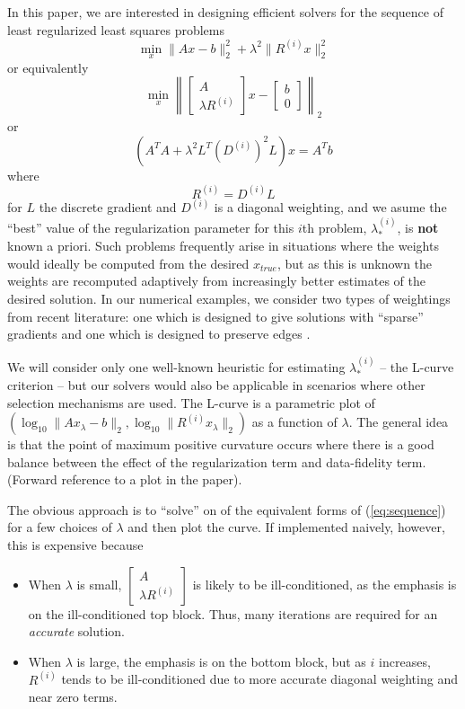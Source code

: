 In this paper, we are interested in designing efficient solvers for the sequence of least regularized least squares problems
\begin{equation} \label{eq:sequence} \min_{x} \| A x - b \|_2^2 + \lambda^2 \| R^{(i)} x \|_2^2 \end{equation}
or equivalently
\[ \min_x \left\| \left[ \begin{matrix} A \\ \lambda R^{(i)} \end{matrix} \right] x - \left[ \begin{matrix} b \\ 0 \end{matrix} \right] \right\|_2 \]
or 
\[ (A^TA + \lambda^2 L^T (D^{(i)})^2 L ) x = A^T b \]
where 
\[ R^{(i)} = D^{(i)} L \] 
for $L$ the discrete gradient and $D^{(i)}$ is a diagonal weighting, and we asume the ``best'' value of the regularization parameter for this $i$th problem, $\lambda^{(i)}_{*}$, is {\bf not} known a priori.   Such problems
frequently arise in situations where the weights would ideally be computed from the desired $x_{true}$, but as this is unknown the weights are recomputed adaptively from increasingly better estimates of the desired solution.    
In our numerical examples, we consider two types of weightings from recent literature:  one which is designed to give solutions with ``sparse'' gradients \cite{IRLS} and one which is designed to preserve edges \cite{KilmerEtalICIAM15}.  

We will consider only
one well-known heuristic for estimating $\lambda^{(i)}_*$ -- the L-curve criterion -- but our solvers would also be applicable in scenarios where other selection mechanisms are used.       
The L-curve \cite{OlearyHansen,etc} is a parametric plot of $( \log_10 \|A x_{\lambda} - b \|_2,\log_10 \| R^{(i)} x_{\lambda} \|_2)$ as a function of $\lambda$.   The general idea is that the point of maximum positive curvature occurs where there is a good balance between the effect of the regularization term and data-fidelity term.   (Forward reference to a plot in the paper).   

The obvious approach is to ``solve'' on of the equivalent forms of (\ref{eq:sequence}) for a few choices of $\lambda$ and then plot the curve.   If implemented naively, however, this is expensive because
   \begin{itemize}
      \item When $\lambda$ is small,   $\left[ \begin{matrix} A \\ \lambda R^{(i)} \end{matrix} \right] $ is likely to be ill-conditioned, as the emphasis is on the ill-conditioned top block.   Thus, many iterations are required for an {\it accurate} solution.
      \item When $\lambda$ is large, the emphasis is on the bottom block, but as $i$ increases, $R^{(i)}$ tends
      to be ill-conditioned due to more accurate diagonal weighting and near zero terms.
      \end{itemize}
      

